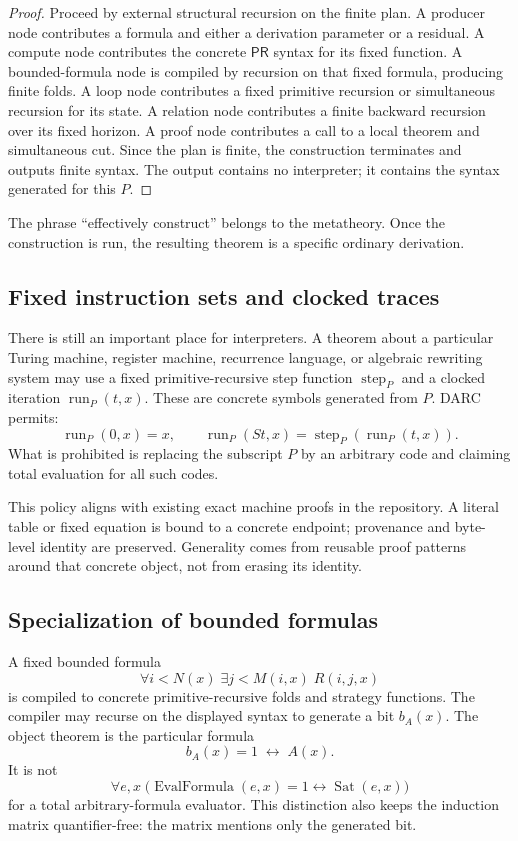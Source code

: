 \begin{proof}
Proceed by external structural recursion on the finite plan.  A producer node
contributes a formula and either a derivation parameter or a residual.  A
compute node contributes the concrete \(\mathsf{PR}\) syntax for its fixed
function.  A bounded-formula node is compiled by recursion on that fixed
formula, producing finite folds.  A loop node contributes a fixed primitive
recursion or simultaneous recursion for its state.  A relation node contributes
a finite backward recursion over its fixed horizon.  A proof node contributes
a call to a local theorem and simultaneous cut.  Since the plan is finite, the
construction terminates and outputs finite syntax.  The output contains no
interpreter; it contains the syntax generated for this \(P\).
\end{proof}

The phrase ``effectively construct'' belongs to the metatheory.  Once the
construction is run, the resulting theorem is a specific ordinary derivation.

\subsection{Fixed instruction sets and clocked traces}

There is still an important place for interpreters.  A theorem about a
particular Turing machine, register machine, recurrence language, or algebraic
rewriting system may use a fixed primitive-recursive step function
\(\operatorname{step}_P\) and a clocked iteration
\(\operatorname{run}_P(t,x)\).  These are concrete symbols generated from
\(P\).  DARC permits:
\[
 \operatorname{run}_P(0,x)=x,
 \qquad
 \operatorname{run}_P(S t,x)=\operatorname{step}_P(
   \operatorname{run}_P(t,x)).
\]
What is prohibited is replacing the subscript \(P\) by an arbitrary code and
claiming total evaluation for all such codes.

This policy aligns with existing exact machine proofs in the repository.  A
literal table or fixed equation is bound to a concrete endpoint; provenance
and byte-level identity are preserved.  Generality comes from reusable proof
patterns around that concrete object, not from erasing its identity.

\subsection{Specialization of bounded formulas}

A fixed bounded formula
\[
  \forall i<N(x)\;\exists j<M(i,x)\;R(i,j,x)
\]
is compiled to concrete primitive-recursive folds and strategy functions.  The
compiler may recurse on the displayed syntax to generate a bit
\(b_A(x)\).  The object theorem is the particular formula
\[
  b_A(x)=1\;\leftrightarrow\;A(x).
\]
It is not
\[
  \forall e,x\;\bigl(\operatorname{EvalFormula}(e,x)=1
    \leftrightarrow \operatorname{Sat}(e,x)\bigr)
\]
for a total arbitrary-formula evaluator.  This distinction also keeps the
induction matrix quantifier-free: the matrix mentions only the generated bit.

